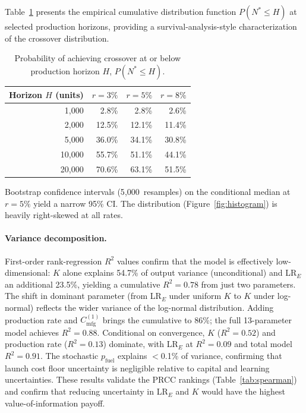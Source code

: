 \documentclass[preprint,12pt]{elsarticle}
\begin{document}
Table~\ref{tab:convergence} presents the empirical cumulative distribution function $P(N^* \leq H)$ at selected production horizons, providing a survival-analysis-style characterization of the crossover distribution.

\begin{table}[htbp]
\centering
\caption{Probability of achieving crossover at or below production horizon $H$, $P(N^* \leq H)$.}
\label{tab:convergence}
\small
\begin{tabular}{@{}rrrr@{}}
\toprule
Horizon $H$ (units) & $r = 3\%$ & $r = 5\%$ & $r = 8\%$ \\
\midrule
1{,}000  & 2.8\% & 2.8\% & 2.6\% \\
2{,}000  & 12.5\% & 12.1\% & 11.4\% \\
5{,}000  & 36.0\% & 34.1\% & 30.8\% \\
10{,}000 & 55.7\% & 51.1\% & 44.1\% \\
20{,}000 & 70.6\% & 63.1\% & 51.5\% \\
\bottomrule
\end{tabular}
\end{table}

Bootstrap confidence intervals (5{,}000~resamples) on the conditional median at $r = 5\%$ yield a narrow 95\% CI. The distribution (Figure~\ref{fig:histogram}) is heavily right-skewed at all rates.

\paragraph{Variance decomposition.}
\label{sec:sobol}
First-order rank-regression $R^2$ values confirm that the model is effectively low-dimensional: $K$ alone explains 54.7\% of output variance (unconditional) and LR$_E$ an additional 23.5\%, yielding a cumulative $R^2 = 0.78$ from just two parameters. The shift in dominant parameter (from LR$_E$ under uniform $K$ to $K$ under log-normal) reflects the wider variance of the log-normal distribution. Adding production rate and $C_{\mathrm{mfg}}^{(1)}$ brings the cumulative to 86\%; the full 13-parameter model achieves $R^2 = 0.88$. Conditional on convergence, $K$ ($R^2 = 0.52$) and production rate ($R^2 = 0.13$) dominate, with LR$_E$ at $R^2 = 0.09$ and total model $R^2 = 0.91$. The stochastic $p_{\mathrm{fuel}}$ explains $<$0.1\% of variance, confirming that launch cost floor uncertainty is negligible relative to capital and learning uncertainties. These results validate the PRCC rankings (Table~\ref{tab:spearman}) and confirm that reducing uncertainty in LR$_E$ and $K$ would have the highest value-of-information payoff.
\end{document}
